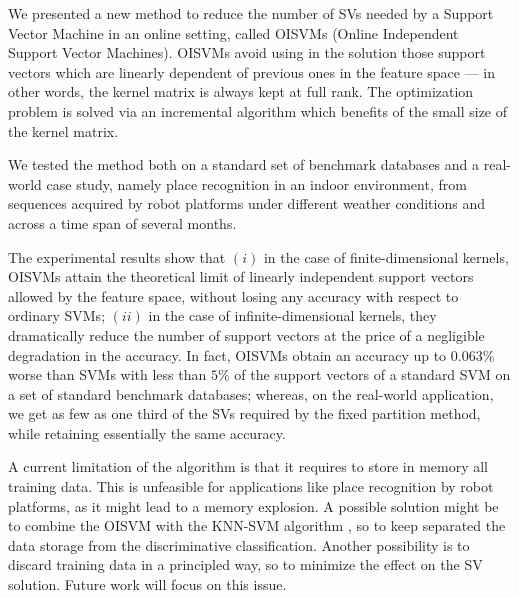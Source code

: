 We presented a new method to reduce the number of SVs needed by a
Support Vector Machine in an online setting, called OISVMs (Online
Independent Support Vector Machines). OISVMs avoid using in the
solution those support vectors which are linearly dependent of
previous ones in the feature space --- in other words, the kernel
matrix is always kept at full rank. The optimization problem is solved
via an incremental algorithm which benefits of the small size of the
kernel matrix.

We tested the method both on a standard set of benchmark databases and
a real-world case study, namely place recognition in an indoor
environment, from sequences acquired by robot platforms under
different weather conditions and across a time span of several months.

The experimental results show that $(i)$ in the case of
finite-dimensional kernels, OISVMs attain the theoretical limit of
linearly independent support vectors allowed by the feature space,
without losing any accuracy with respect to ordinary SVMs; $(ii)$ in
the case of infinite-dimensional kernels, they dramatically reduce the
number of support vectors at the price of a negligible degradation in
the accuracy. In fact, OISVMs obtain an accuracy up to $0.063\%$ worse
than SVMs with less than $5\%$ of the support vectors of a standard
SVM on a set of standard benchmark databases; whereas, on the
real-world application, we get as few as one third of the SVs required
by the fixed partition method, while retaining essentially the same
accuracy.

A current limitation of the algorithm is that it requires to store in
memory all training data. This is unfeasible for applications like
place recognition by robot platforms, as it might lead to a memory
explosion. A possible solution might be to combine the OISVM with the
KNN-SVM algorithm \cite{zhang:cvpr06}, so to keep separated the data
storage from the discriminative classification. Another possibility is
to discard training data in a principled way, so to minimize the
effect on the SV solution. Future work will focus on this issue.
